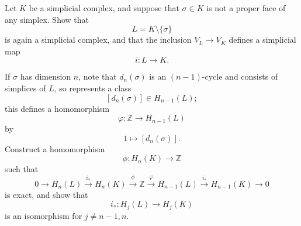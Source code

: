 \begin{problem}
Let \(K\) be a simplicial complex, and suppose that \(\sigma\in K\) is not a proper face of any simplex. Show that
\[
L=K\setminus\{\sigma\}
\]
is again a simplicial complex, and that the inclusion \(V_L\to V_K\) defines a simplicial map
\[
i:L\to K.
\]

If \(\sigma\) has dimension \(n\), note that \(d_n(\sigma)\) is an \((n-1)\)-cycle and consists of simplices of \(L\), so represents a class
\[
[d_n(\sigma)]\in H_{n-1}(L);
\]
this defines a homomorphism
\[
\varphi:\mathbb Z\to H_{n-1}(L)
\]
by
\[
1\mapsto [d_n(\sigma)].
\]
Construct a homomorphism
\[
\phi:H_n(K)\to \mathbb Z
\]
such that
\[
0\longrightarrow H_n(L)\xrightarrow{i_*} H_n(K)\xrightarrow{\phi} \mathbb Z
\xrightarrow{\varphi} H_{n-1}(L)\xrightarrow{i_*} H_{n-1}(K)\longrightarrow 0
\]
is exact, and show that
\[
i_*:H_j(L)\to H_j(K)
\]
is an isomorphism for \(j\neq n-1,n\).
\end{problem}

